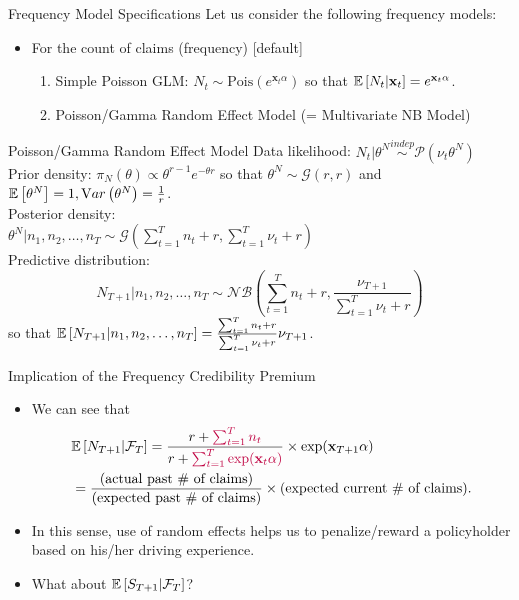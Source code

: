 \documentclass[ignorenonframetext,]{beamer}
\begin{document}
\begin{frame}{Frequency Model Specifications}
Let us consider the following frequency models:
\begin{itemize}
	\item For the count of claims (frequency)
	[default]
	\begin{enumerate}[(1)]
		\item Simple Poisson GLM: $N_t \sim \text{Pois}(e^{\mathbf{x}_t \alpha})$ so that ${\mathbb E}\left[N_t|\mathbf{x}_t\right] = e^{\mathbf{x}_t\alpha}$.
		\item {\color{blue} Poisson/Gamma Random Effect Model (= Multivariate NB Model)}
	\end{enumerate}
\end{itemize}
\end{frame}

\begin{frame}{Poisson/Gamma Random Effect Model}
Data likelihood: $N_t|\theta^N \overset{indep}{\sim} \mathcal{P}(\nu_t \theta^N)$ \\
Prior density: $\pi_N(\theta) \propto \theta^{r-1}e^{-\theta r}$ so that $\theta^N \sim \mathcal{G}(r,r)$ and ${\mathbb E}\left[\theta^N\right]=1, {\mathrm Var}\left(\theta^N\right)=\frac{1}{r}$. \\
Posterior density: \\
$\theta^N|n_1, n_2, \ldots, n_T \sim \mathcal{G}(\sum_{t=1}^T n_t + r, \sum_{t=1}^T \nu_t + r)$ \\
{\color{purple} Predictive distribution:}
\begin{equation}\label{p2:eq:mvnb}
N_{T+1}|n_1, n_2, \ldots, n_T \sim \mathcal{NB}\left(\sum_{t=1}^T n_t + r, \frac{\nu_{T+1}}{\sum_{t=1}^T \nu_t + r}\right)
\end{equation}
so that ${\mathbb E}\left[N_{T+1}|n_1, n_2, \ldots, n_T\right] = \frac{\sum_{t=1}^T n_t + r}{\sum_{t=1}^T \nu_t + r}\nu_{T+1}$.
\end{frame}

\begin{frame}{Implication of the Frequency Credibility Premium}
\begin{itemize}
	\item We can see that
	\begin{align*}
		&{\mathbb E}\left[N_{T+1}|\mathcal{F}_T\right] = \frac{r+{\color{purple}\sum_{t=1}^T n_t}}{r+{\color{purple}\sum_{t=1}^T \exp(\mathbf{x}_t\alpha)}} \times \exp(\mathbf{x}_{T+1}\alpha) \\
		&= \frac{\text{(actual past \# of claims)}}{\text{(expected past \# of claims)}} \times \text{(expected current \# of claims)}.
	\end{align*}
	\item In this sense, use of random effects helps us to penalize/reward a policyholder based on his/her driving experience.
	\item What about ${\mathbb E}\left[S_{T+1}|\mathcal{F}_T\right]$?
\end{itemize}
\end{frame}
\end{document}
